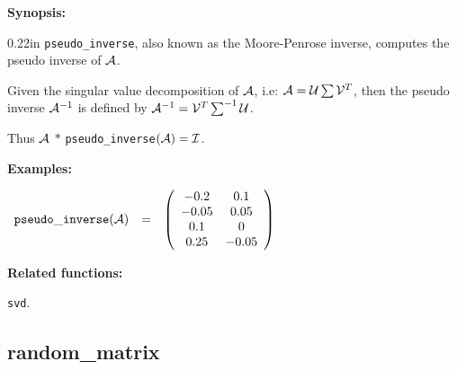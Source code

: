 {\bf Synopsis:} %

\begin{addtolength}{\leftskip}{0.22in}
{\tt pseudo\_inverse}, also known as the Moore-Penrose inverse, computes
the pseudo inverse of ${\cal A}$. 

Given the singular value decomposition of ${\cal A}$, i.e: ${\cal A} = 
{\cal U} 
\sum {\cal V}^T$, then the pseudo inverse ${\cal A}^{-1}$ is defined 
by ${\cal A}^{-1} = {\cal V}^T \sum^{-1} {\cal U}$.

Thus ${\cal A}$ $ * $ {\tt pseudo\_inverse}$({\cal A}) = {\cal I}$.

\end{addtolength}

{\bf Examples:}


\begin{flushleft}  
\hspace*{0.1in}
\begin{math}  
\begin{array}{ccc}
{\tt pseudo\_inverse}({\cal A}) & = & 
        \left( \begin{array}{cc} -0.2 & 0.1 \\ -0.05 & 0.05 \\ 0.1 & 0 
\\ 0.25 & -0.05 
 \end{array} \right) 
\end{array}
\end{math}  
\end{flushleft}

{\bf Related functions:}

\hspace*{0.175in} {\tt svd}.

\subsection{random\_matrix}


